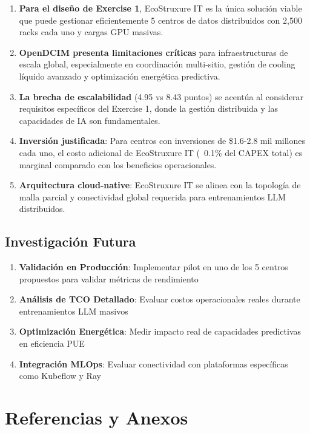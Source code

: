 \documentclass[12pt,a4paper]{article}
\begin{document}
\begin{enumerate}
    \item \textbf{Para el diseño de Exercise 1}, EcoStruxure IT es la única solución viable que puede gestionar eficientemente 5 centros de datos distribuidos con 2,500 racks cada uno y cargas GPU masivas.

    \item \textbf{OpenDCIM presenta limitaciones críticas} para infraestructuras de escala global, especialmente en coordinación multi-sitio, gestión de cooling líquido avanzado y optimización energética predictiva.

    \item \textbf{La brecha de escalabilidad} (4.95 vs 8.43 puntos) se acentúa al considerar requisitos específicos del Exercise 1, donde la gestión distribuida y las capacidades de IA son fundamentales.

    \item \textbf{Inversión justificada}: Para centros con inversiones de \$1.6-2.8 mil millones cada uno, el costo adicional de EcoStruxure IT (~0.1\% del CAPEX total) es marginal comparado con los beneficios operacionales.

    \item \textbf{Arquitectura cloud-native}: EcoStruxure IT se alinea con la topología de malla parcial y conectividad global requerida para entrenamientos LLM distribuidos.
\end{enumerate}

\subsection{Investigación Futura}

\begin{enumerate}
    \item \textbf{Validación en Producción}: Implementar pilot en uno de los 5 centros propuestos para validar métricas de rendimiento
    \item \textbf{Análisis de TCO Detallado}: Evaluar costos operacionales reales durante entrenamientos LLM masivos
    \item \textbf{Optimización Energética}: Medir impacto real de capacidades predictivas en eficiencia PUE
    \item \textbf{Integración MLOps}: Evaluar conectividad con plataformas específicas como Kubeflow y Ray
\end{enumerate}

\section{Referencias y Anexos}
\end{document}
